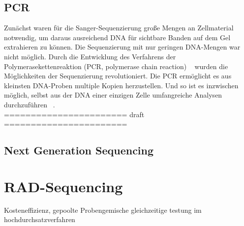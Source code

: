 \subsection{PCR}  \label{subsec:pcr}

Zunächst waren für die Sanger-Sequenzierung große Mengen an Zellmaterial notwendig, um daraus ausreichend DNA für sichtbare Banden auf dem Gel extrahieren zu können. Die Sequenzierung mit nur geringen DNA-Mengen war nicht möglich. Durch die Entwicklung des Verfahrens der Polymerasekettenreaktion (PCR, polymerase chain reaction) ~\cite{mullis_1986} wurden die Möglichkeiten der Sequenzierung revolutioniert. Die PCR ermöglicht es aus kleinsten DNA-Proben multiple Kopien herzustellen. Und so ist es inzwischen möglich, selbst aus der DNA einer einzigen Zelle umfangreiche Analysen durchzuführen ~\cite{gawad_2016}. \\



\noindent======================= draft =======================\\




\subsection{Next Generation Sequencing} \label{subsec:ngs}

\section{RAD-Sequencing} \label{sec:rad}

Kosteneffizienz, gepoolte Probengemische gleichzeitige testung im hochdurchsatzverfahren
%
%
%
%
%
%
%
%
%
%
%

